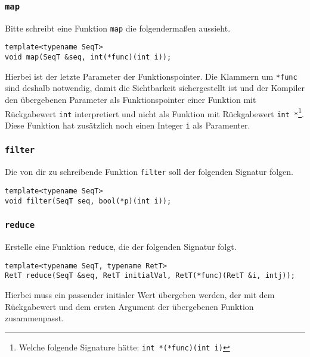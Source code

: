 \subsubsection{\lstinline{map}}

Bitte schreibt eine Funktion \lstinline{map} die folgendermaßen aussieht.

\begin{lstlisting}
template<typename SeqT>
void map(SeqT &seq, int(*func)(int i));
\end{lstlisting}

Hierbei ist der letzte Parameter der Funktionspointer.
Die Klammern um \lstinline{*func} sind deshalb notwendig, damit die Sichtbarkeit sichergestellt ist und der Kompiler den übergebenen Parameter als Funktionspointer einer Funktion mit Rückgabewert \lstinline{int} interpretiert und nicht als Funktion mit Rückgabewert \lstinline{int *}\footnote{Welche folgende Signature hätte: \lstinline{int *(*func)(int i)}}.
Diese Funktion hat zusätzlich noch einen Integer \lstinline{i} als Paramenter.

\subsubsection{\lstinline{filter}}

Die von dir zu schreibende Funktion \lstinline{filter} soll der folgenden Signatur folgen.

\begin{lstlisting}
template<typename SeqT>
void filter(SeqT seq, bool(*p)(int i));
\end{lstlisting}

\subsubsection{\lstinline{reduce}}

Erstelle eine Funktion \lstinline{reduce}, die der folgenden Signatur folgt.

\begin{lstlisting}
template<typename SeqT, typename RetT>
RetT reduce(SeqT &seq, RetT initialVal, RetT(*func)(RetT &i, intj));
\end{lstlisting}

Hierbei muss ein passender initialer Wert übergeben werden, der mit dem Rückgabewert und dem ersten Argument der übergebenen Funktion zusammenpasst.
